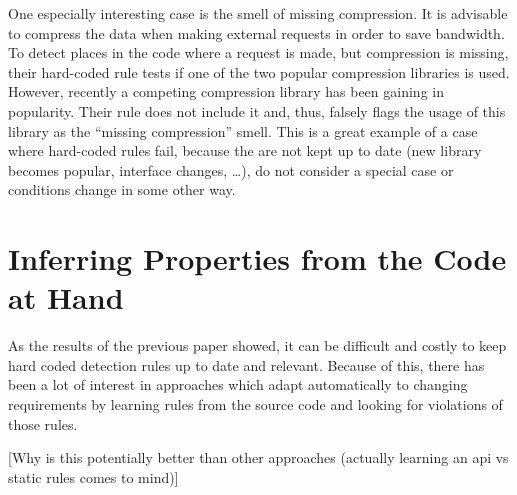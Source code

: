 One especially interesting case is the smell of missing compression.
It is advisable to compress the data when making external requests in order to save bandwidth.
To detect places in the code where a request is made, but compression is missing, their hard-coded rule tests if one of the two popular compression libraries is used.
However, recently a competing compression library has been gaining in popularity.
Their rule does not include it and, thus, falsely flags the usage of this library as the ``missing compression'' smell.
This is a great example of a case where hard-coded rules fail, because the are not kept up to date (new library becomes popular, interface changes, \ldots), do not consider a special case or conditions change in some other way.

\section{Inferring Properties from the Code at Hand}


As the results of the previous paper showed, it can be difficult and costly to keep hard coded detection rules up to date and relevant.
Because of this, there has been a lot of interest in approaches which adapt automatically to changing requirements by learning rules from the source code and looking for violations of those rules.

[Why is this potentially better than other approaches (actually learning an api vs static rules comes to mind)]


